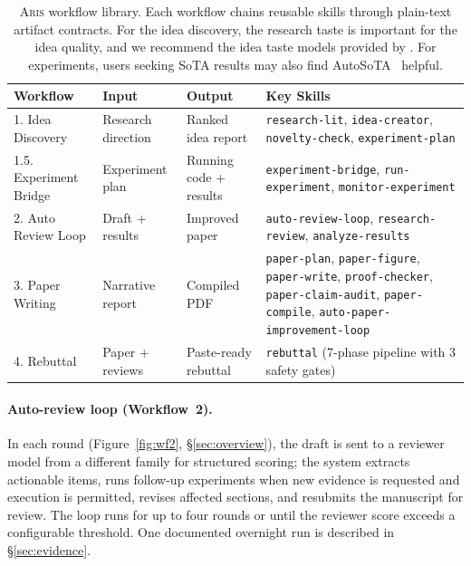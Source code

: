 \documentclass{article}
\newcommand{\aris}{\textsc{Aris}}
\theoremstyle{remark}
\begin{document}
\begin{table}[t]
\centering
\caption{\aris{} workflow library. Each workflow chains reusable skills through plain-text artifact contracts. For the idea discovery, the research taste is important for the idea quality, and we recommend the idea taste models provided by \citet{tong2026aitaste}. For experiments, users seeking SoTA results may also find AutoSoTA~\citep{li2026autosota} helpful.}
\label{tab:workflows}
\footnotesize
\begin{tabular}{@{}p{2.6cm}p{2.3cm}p{2.6cm}p{5.5cm}@{}}
\toprule
\textbf{Workflow} & \textbf{Input} & \textbf{Output} & \textbf{Key Skills} \\
\midrule
1. Idea Discovery & Research direction & Ranked idea report & \texttt{research-lit}, \texttt{idea-creator}, \texttt{novelty-check}, \texttt{experiment-plan} \\
1.5. Experiment Bridge & Experiment plan & Running code + results & \texttt{experiment-bridge}, \texttt{run-experiment}, \texttt{monitor-experiment} \\
2. Auto Review Loop & Draft + results & Improved paper & \texttt{auto-review-loop}, \texttt{research-review}, \texttt{analyze-results} \\
3. Paper Writing & Narrative report & Compiled PDF & \texttt{paper-plan}, \texttt{paper-figure}, \texttt{paper-write}, \texttt{proof-checker}, \texttt{paper-claim-audit}, \texttt{paper-compile}, \texttt{auto-paper-improvement-loop} \\
4. Rebuttal & Paper + reviews & Paste-ready rebuttal & \texttt{rebuttal} (7-phase pipeline with 3 safety gates) \\
\bottomrule
\end{tabular}
\end{table}

\paragraph{Auto-review loop (Workflow~2).}
In each round (Figure~\ref{fig:wf2}, \S\ref{sec:overview}), the draft is sent to a reviewer model from a different family for structured scoring; the system extracts actionable items, runs follow-up experiments when new evidence is requested and execution is permitted, revises affected sections, and resubmits the manuscript for review.
The loop runs for up to four rounds or until the reviewer score exceeds a configurable threshold.
One documented overnight run is described in \S\ref{sec:evidence}.
\end{document}
